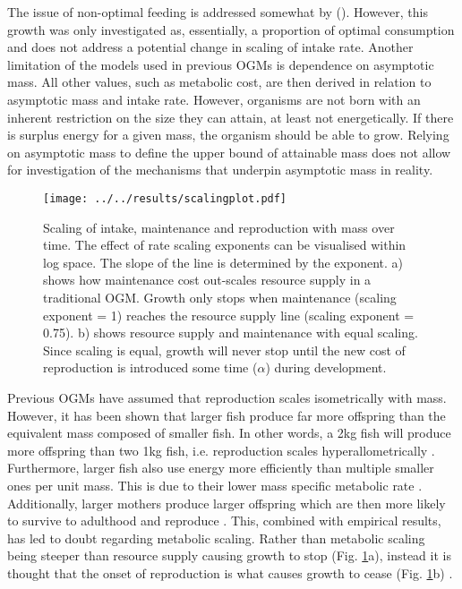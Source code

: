 \documentclass[a4paper, 11pt, hidelinks]{article} %
\begin{document}
	The issue of non-optimal feeding is addressed somewhat by \citeauthor{Hou2011} (\citeyear{Hou2011}).  However, this growth was only investigated as, essentially, a proportion of optimal consumption and does not address a potential change in scaling of intake rate.
	Another limitation of the models used in previous OGMs is dependence on asymptotic mass.  
	All other values, such as metabolic cost, are then derived in relation to asymptotic mass and intake rate.  However, organisms are not born with an inherent restriction on the size they can attain, at least not energetically.  If there is surplus energy for a given mass, the organism should be able to grow.  Relying on asymptotic mass to define the upper bound of attainable mass does not allow for investigation of the mechanisms that underpin asymptotic mass in reality. 
	\begin{figure}[h!]
		\centering
		\texttt{[image: ../../results/scalingplot.pdf]}
		\caption{Scaling of intake, maintenance and reproduction with mass over time.  The effect of rate scaling exponents can be visualised within log space.  The slope of the line is determined by the exponent.  a) shows how maintenance cost out-scales resource supply in a traditional OGM.  Growth only stops when maintenance (scaling exponent = 1) reaches the resource supply line (scaling exponent = 0.75).  b) shows resource supply and maintenance with equal scaling. Since scaling is equal, growth will never stop until the new cost of reproduction is introduced some time ($\alpha$) during development.}
		\label{scaling_plot}
	\end{figure}
	
	Previous OGMs have assumed that reproduction scales isometrically with mass.  
	However, it has been shown that larger fish produce far more offspring than the equivalent mass composed of smaller fish.  In other words, a 2kg fish will produce more offspring than two 1kg fish, i.e. reproduction scales hyperallometrically \parencite{Barneche2018}.
	Furthermore, larger fish also use energy more efficiently than multiple smaller ones per unit mass.  This is due to their lower mass specific metabolic rate \parencite{Kleiber1932, Peters1983, Brown2004}.  
	Additionally, larger mothers produce larger offspring which are then more likely to survive to adulthood and reproduce \parencite{Marshall2006, Hixon2014}. 
	This, combined with empirical results, has led to doubt regarding metabolic scaling.  Rather than metabolic scaling being steeper than resource supply causing growth to stop (Fig. \ref{scaling_plot}a), instead it is thought that the onset of reproduction is what causes growth to cease (Fig. \ref{scaling_plot}b) \parencite{Marshall2019, Sibly2020}.
	
\end{document}
